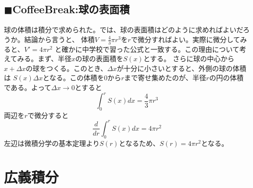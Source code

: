 \documentclass[a4j,dvipdfmx]{jsarticle}
\begin{document}
\subsection{$\blacksquare$CoffeeBreak:球の表面積}
\begin{screen}
    球の体積は積分で求められた。では、球の表面積はどのように求めればよいだろうか。結論から言うと、
    体積$\displaystyle V=\frac{4}{3}\pi r^3$を$r$で微分すればよい。実際に微分してみると、$V'=4\pi r^2$
    と確かに中学校で習った公式と一致する。この理由について考えてみる。まず、半径$x$の球の表面積を$S(x)$とする。
    さらに球の中心から$x+\Delta x$の球をつくる。このとき、$\Delta x$が十分に小さいとすると、外側の球の体積は
    $S(x)\Delta x$となる。この体積を$0$から$r$まで寄せ集めたのが、半径$r$の円の体積である。よって$\Delta x\to 0$とすると
    \begin{equation*}
        \int_0^r S(x)dx=\frac{4}{3}\pi r^3
    \end{equation*}
    両辺を$r$で微分すると
    \begin{equation*}
        \frac{d}{dr}\int_0^r S(x)dx=4\pi r^2
    \end{equation*}
    左辺は微積分学の基本定理より$S(r)$となるため、$S(r)=4\pi r^2$となる。
\end{screen}
\newpage
\section{広義積分}
\end{document}
